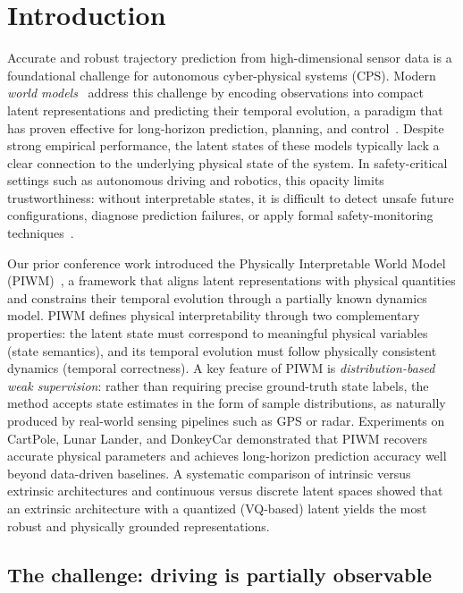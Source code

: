 \documentclass[preprint,12pt]{elsarticle}
\begin{document}
\section{Introduction}\label{sec:intro}

Accurate and robust trajectory prediction from high-dimensional sensor data
is a foundational challenge for autonomous cyber-physical systems (CPS).
Modern \emph{world models}~\cite{ha2018world} address this challenge by
encoding observations into compact latent representations and predicting their
temporal evolution, a paradigm that has proven effective for long-horizon
prediction, planning, and control~\cite{micheli2022transformers,
hafner2023mastering, seo2023masked}.
Despite strong empirical performance, the latent states of these models
typically lack a clear connection to the underlying physical state of the
system.
In safety-critical settings such as autonomous driving and robotics, this
opacity limits trustworthiness: without interpretable states, it is difficult
to detect unsafe future configurations, diagnose prediction failures, or apply
formal safety-monitoring techniques~\cite{hasan2015formal, katz2022verification,
alshiekh2018safe}.

Our prior conference work introduced the Physically Interpretable World Model
(PIWM)~\cite{piwm_conf}, a framework that aligns latent representations with
physical quantities and constrains their temporal evolution through a partially
known dynamics model.
PIWM defines physical interpretability through two complementary properties:
the latent state must correspond to meaningful physical variables (state
semantics), and its temporal evolution must follow physically consistent
dynamics (temporal correctness).
A key feature of PIWM is \emph{distribution-based weak supervision}: rather than
requiring precise ground-truth state labels, the method accepts state estimates
in the form of sample distributions, as naturally produced by real-world sensing
pipelines such as GPS or radar.
Experiments on CartPole, Lunar Lander, and DonkeyCar demonstrated that
PIWM recovers accurate physical parameters and achieves long-horizon prediction
accuracy well beyond data-driven baselines.
A systematic comparison of intrinsic versus extrinsic architectures and
continuous versus discrete latent spaces showed that an extrinsic architecture
with a quantized (VQ-based) latent yields the most robust and physically grounded
representations.

\subsection*{The challenge: driving is partially observable}
\end{document}
